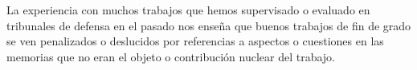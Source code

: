 La experiencia con muchos trabajos que hemos supervisado o evaluado en tribunales de defensa en el pasado nos enseña que buenos trabajos de fin de grado se ven penalizados o deslucidos por referencias a aspectos o cuestiones en las memorias que no eran el objeto o contribución nuclear del trabajo.



